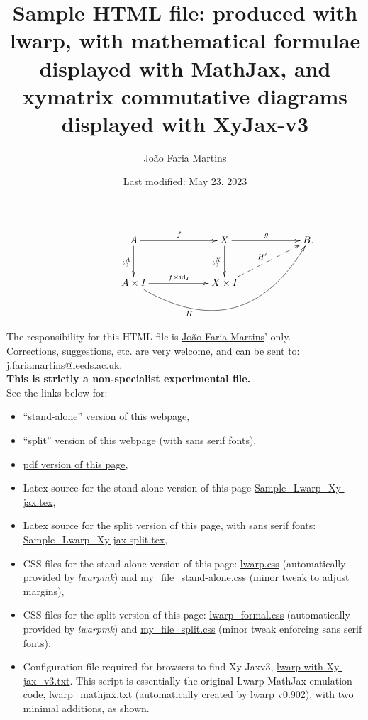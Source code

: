 \documentclass[a4paper,12pt]{article}
\newtheorem{Fundamental Theorem}{Fundamental Theorem}
\def \id {\mathrm{id}}
\begin{document}
\title{Sample HTML file: produced with  lwarp, with mathematical formulae displayed with  MathJax, and  xymatrix commutative  diagrams displayed  with XyJax-v3}
\author{Jo\~{a}o Faria Martins}
\date{Last modified: May 23, 2023}
\maketitle

\tableofcontents
$$\xymatrix@R=30pt@C=60pt
{&A\ar[d]_{\iota_0^A}  \ar[r]^f & X\ar[d]_{\iota_0^X} \ar[r]^g & B.\\
            & A \times I  \ar@/_4pc/[rru]_<<<<<<<<<<<{H} \ar[r]^{f \times \id_I} & X\times I \ar@{-->}[ur]^{H'} } $$

\noindent The responsibility for this HTML file is \href{http://www1.maths.leeds.ac.uk/~pmtjfa/index.html}{Jo\~{a}o Faria Martins}' only.\\ 
Corrections, suggestions, etc. are very welcome, and can be sent to:
\href{mailto:j.fariamartins@leeds.ac.uk}{j.fariamartins@leeds.ac.uk}.\\
\textbf{This is strictly a non-specialist experimental file.} \\


See the links below for:
\begin{itemize}
   \item \href{Sample_Lwarp_Xy-jax.html}{``stand-alone'' version of this webpage},
   \item \href{Sample_Lwarp_Xy-jax-split-index.html}{``split'' version of this webpage} (with sans serif fonts),
    \item \href{Sample_Lwarp_Xy-jax.pdf}{pdf version of this page},
   \item Latex source for the stand alone version of this page \href{Sample_Lwarp_Xy-jax.tex}{Sample\_Lwarp\_Xy-jax.tex},
    \item Latex source for the split version of this page, with sans serif fonts: \href{Sample_Lwarp_Xy-jax-split.tex}{Sample\_Lwarp\_Xy-jax-split.tex},
   \item CSS files for the stand-alone version of this page: \href{lwarp.css}{lwarp.css} (automatically provided by \emph{lwarpmk}) and \href{my_file_stand-alone.css}{my\_file\_stand-alone.css} (minor tweak to adjust margins),
   \item CSS files for the split version of this page: \href{lwarp\_formal.css}{lwarp\_formal.css} (automatically provided by \emph{lwarpmk}) and \href{my_file_split.css}{my\_file\_split.css} (minor tweak enforcing sans serif fonts).
   \item Configuration file required for browsers to find Xy-Jaxv3,
\href{lwarp-with-Xy-jax_v3.txt}{lwarp-with-Xy-jax\_v3.txt}. This script is essentially the original Lwarp MathJax emulation code, \href{lwarp_mathjax.txt}{lwarp\_mathjax.txt}  (automatically created by  lwarp v0.902), with two minimal additions, as shown.
\end{itemize}
\end{document}
